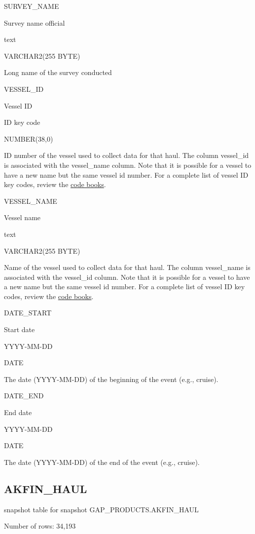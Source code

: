 \documentclass[
  letterpaper,
  oneside,
  open=any]{scrbook}
\begin{document}
SURVEY\_NAME

Survey name official

text

VARCHAR2(255 BYTE)

Long name of the survey conducted

VESSEL\_ID

Vessel ID

ID key code

NUMBER(38,0)

ID number of the vessel used to collect data for that haul. The column
vessel\_id is associated with the vessel\_name column. Note that it is
possible for a vessel to have a new name but the same vessel id number.
For a complete list of vessel ID key codes, review the
\href{https://www.fisheries.noaa.gov/resource/document/groundfish-survey-species-code-manual-and-data-codes-manual}{code
books}.

VESSEL\_NAME

Vessel name

text

VARCHAR2(255 BYTE)

Name of the vessel used to collect data for that haul. The column
vessel\_name is associated with the vessel\_id column. Note that it is
possible for a vessel to have a new name but the same vessel id number.
For a complete list of vessel ID key codes, review the
\href{https://www.fisheries.noaa.gov/resource/document/groundfish-survey-species-code-manual-and-data-codes-manual}{code
books}.

DATE\_START

Start date

YYYY-MM-DD

DATE

The date (YYYY-MM-DD) of the beginning of the event (e.g., cruise).

DATE\_END

End date

YYYY-MM-DD

DATE

The date (YYYY-MM-DD) of the end of the event (e.g., cruise).

\subsection{AKFIN\_HAUL}\label{akfin_haul}

snapshot table for snapshot GAP\_PRODUCTS.AKFIN\_HAUL

Number of rows: 34,193
\end{document}
